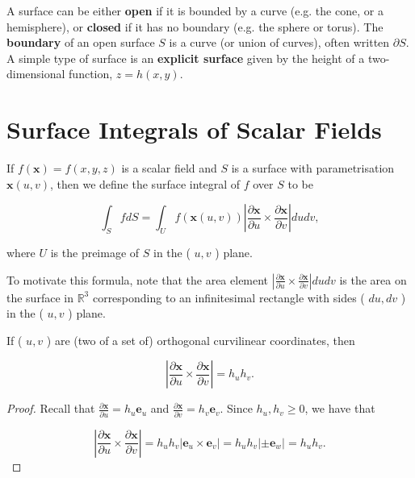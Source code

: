\begin{definition}
  A surface can be either \textbf{open} if it is bounded by a curve (e.g. the cone, or a hemisphere), or \textbf{closed} if it has no boundary (e.g. the sphere or torus). The \textbf{boundary} of an open surface \(S\) is a curve (or union of curves), often written \(\partial S\). A simple type of surface is an \textbf{explicit surface} given by the height of a two-dimensional function, \(z=h(x, y)\).
\end{definition}

\section{Surface Integrals of Scalar Fields}

\begin{definition}
  If \(f(\boldsymbol{x})=f(x, y, z)\) is a scalar field and \(S\) is a surface with parametrisation \(\boldsymbol{x}(u, v)\), then we define the surface integral of \(f\) over \(S\) to be

\[
\int_S f d S=\int_U f(\boldsymbol{x}(u, v))\left|\frac{\partial \boldsymbol{x}}{\partial u} \times \frac{\partial \boldsymbol{x}}{\partial v}\right| d u d v,
\]

where \(U\) is the preimage of \(S\) in the ( \(u, v\) ) plane.
\end{definition}

\begin{remark}
  To motivate this formula, note that the area element \(\left|\frac{\partial \boldsymbol{x}}{\partial u} \times \frac{\partial \boldsymbol{x}}{\partial v}\right| d u d v\) is the area on the surface in \(\mathbb{R}^3\) corresponding to an infinitesimal rectangle with sides ( \(d u, d v\) ) in the ( \(u, v\) ) plane.    
\end{remark}

\begin{proposition}
  If ( \(u, v\) ) are (two of a set of) orthogonal curvilinear coordinates, then

\[
\left|\frac{\partial \boldsymbol{x}}{\partial u} \times \frac{\partial \boldsymbol{x}}{\partial v}\right|=h_u h_v .
\]
\end{proposition}

\begin{proof}
  Recall that \(\frac{\partial \boldsymbol{x}}{\partial u}=h_u \boldsymbol{e}_u\) and \(\frac{\partial \boldsymbol{x}}{\partial v}=h_v \boldsymbol{e}_v\). Since \(h_u, h_v \geq 0\), we have that

\[
\left|\frac{\partial \boldsymbol{x}}{\partial u} \times \frac{\partial \boldsymbol{x}}{\partial v}\right|=h_u h_v\left|\boldsymbol{e}_u \times \boldsymbol{e}_v\right|=h_u h_v\left| \pm \boldsymbol{e}_w\right|=h_u h_v .
\]
\end{proof}

